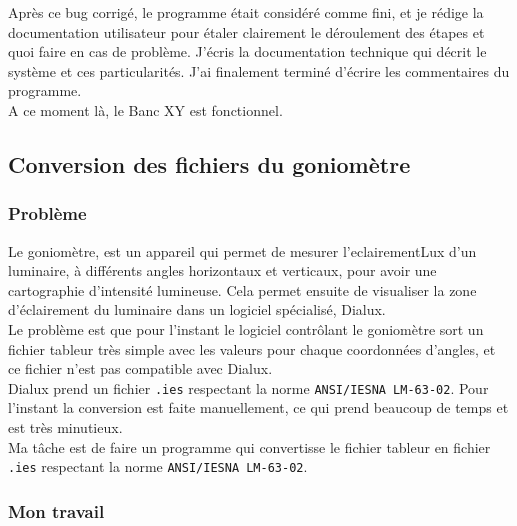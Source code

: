\documentclass[12pt]{article}
\begin{document}
Après ce bug corrigé, le programme était considéré comme fini, et je rédige la documentation utilisateur pour étaler clairement le déroulement des étapes et quoi faire en cas de problème.
J'écris la documentation technique qui décrit le système et ces particularités.
J'ai finalement terminé d'écrire les commentaires du programme.\\
A ce moment là, le Banc XY est fonctionnel.

\newpage
\subsection{Conversion des fichiers du goniomètre }

\subsubsection{Problème}

Le goniomètre, est un appareil qui permet de mesurer l'\gls{eclairementLux} d'un luminaire, à différents angles horizontaux et verticaux, pour avoir une cartographie d'intensité lumineuse.
Cela permet ensuite de visualiser la zone d'éclairement du luminaire dans un logiciel spécialisé, Dialux.\\
Le problème est que pour l'instant le logiciel contrôlant le goniomètre sort un fichier tableur très simple avec les valeurs pour chaque coordonnées d'angles, et ce fichier n'est pas compatible avec Dialux.\\
Dialux prend un fichier \verb|.ies| respectant la norme \verb|ANSI/IESNA LM-63-02|.
Pour l'instant la conversion est faite manuellement, ce qui prend beaucoup de temps et est très minutieux.\\
Ma tâche est de faire un programme qui convertisse le fichier tableur en fichier \verb|.ies| respectant la norme \verb|ANSI/IESNA LM-63-02|.


\subsubsection{ Mon travail  }
\end{document}
